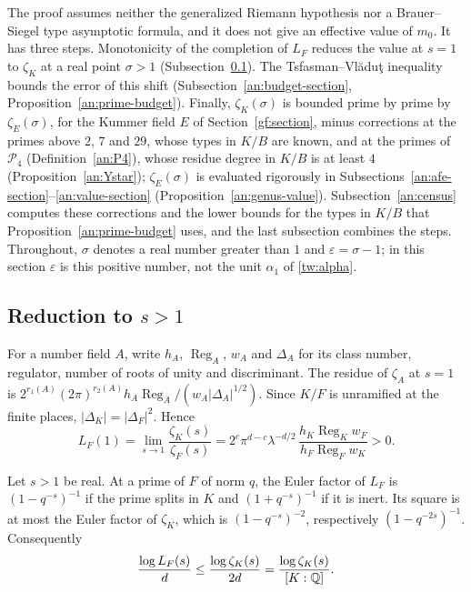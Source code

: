 The proof assumes neither the generalized Riemann hypothesis nor a
Brauer--Siegel type asymptotic formula, and it does not give an effective
value of $m_0$. It has three steps. Monotonicity of the completion of $L_F$
reduces the value at $s=1$ to $\zeta_K$ at a real point $\sigma>1$
(Subsection~\ref{an:reduction}). The Tsfasman--Vl\u{a}du\c{t} inequality
bounds the error of this shift (Subsection~\ref{an:budget-section},
Proposition~\ref{an:prime-budget}). Finally, $\zeta_K(\sigma)$ is bounded
prime by prime by $\zeta_E(\sigma)$, for the Kummer field $E$ of
Section~\ref{gf:section}, minus corrections at the primes above $2$, $7$
and $29$, whose types in $K/B$ are known, and at the primes of
$\mathcal P_4$ (Definition~\ref{an:P4}), whose residue degree in $K/B$ is
at least $4$ (Proposition~\ref{an:Ystar}); $\zeta_E(\sigma)$ is evaluated
rigorously in
Subsections~\ref{an:afe-section}--\ref{an:value-section}
(Proposition~\ref{an:genus-value}). Subsection~\ref{an:census} computes
these corrections and the lower bounds for the types in $K/B$ that
Proposition~\ref{an:prime-budget} uses, and the last subsection combines
the steps. Throughout, $\sigma$ denotes a real number greater than $1$ and
$\varepsilon=\sigma-1$; in this section $\varepsilon$ is this positive
number, not the unit $\alpha_1$ of \eqref{tw:alpha}.

\subsection{\texorpdfstring{Reduction to $s>1$}{Reduction to s > 1}}
\label{an:reduction}
For a number field $A$, write $h_A$, $\operatorname{Reg}_A$, $w_A$ and
$\Delta_A$ for its class number, regulator, number of roots of unity and
discriminant. The residue of $\zeta_A$ at $s=1$ is
$2^{r_1(A)}(2\pi)^{r_2(A)}h_A\operatorname{Reg}_A/(w_A|\Delta_A|^{1/2})$.
Since $K/F$ is unramified at the finite places, $|\Delta_K|=|\Delta_F|^2$.
Hence
\begin{equation}\label{an:class-formula}
 L_F(1)=\lim_{s\to1}\frac{\zeta_K(s)}{\zeta_F(s)}
 =2^c\pi^{d-c}\lambda^{-d/2}\,
 \frac{h_K\operatorname{Reg}_Kw_F}{h_F\operatorname{Reg}_Fw_K}>0.
\end{equation}

Let $s>1$ be real. At a prime of $F$ of norm $q$, the Euler factor of $L_F$
is $(1-q^{-s})^{-1}$ if the prime splits in $K$ and $(1+q^{-s})^{-1}$ if it
is inert. Its square is at most the Euler factor of $\zeta_K$, which is
$(1-q^{-s})^{-2}$, respectively $(1-q^{-2s})^{-1}$. Consequently
\begin{equation}\label{an:relative-euler}
 \frac{\log L_F(s)}d\le\frac{\log\zeta_K(s)}{2d}
 =\frac{\log\zeta_K(s)}{[K:\mathbb Q]}.
\end{equation}

